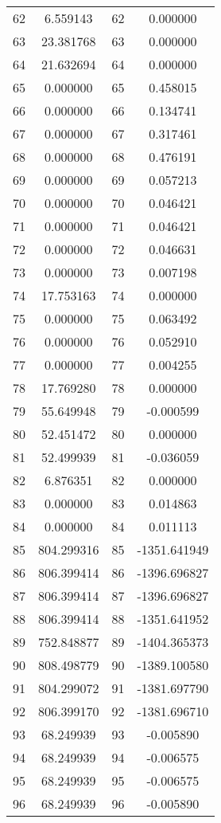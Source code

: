 \documentclass[12pt]{article}
\begin{document}
\begin{longtable}{@{}cccc@{}}
62 & 6.559143 & 62 & 0.000000 \\
63 & 23.381768 & 63 & 0.000000 \\
64 & 21.632694 & 64 & 0.000000 \\
65 & 0.000000 & 65 & 0.458015 \\
66 & 0.000000 & 66 & 0.134741 \\
67 & 0.000000 & 67 & 0.317461 \\
68 & 0.000000 & 68 & 0.476191 \\
69 & 0.000000 & 69 & 0.057213 \\
70 & 0.000000 & 70 & 0.046421 \\
71 & 0.000000 & 71 & 0.046421 \\
72 & 0.000000 & 72 & 0.046631 \\
73 & 0.000000 & 73 & 0.007198 \\
74 & 17.753163 & 74 & 0.000000 \\
75 & 0.000000 & 75 & 0.063492 \\
76 & 0.000000 & 76 & 0.052910 \\
77 & 0.000000 & 77 & 0.004255 \\
78 & 17.769280 & 78 & 0.000000 \\
79 & 55.649948 & 79 & -0.000599 \\
80 & 52.451472 & 80 & 0.000000 \\
81 & 52.499939 & 81 & -0.036059 \\
82 & 6.876351 & 82 & 0.000000 \\
83 & 0.000000 & 83 & 0.014863 \\
84 & 0.000000 & 84 & 0.011113 \\
85 & 804.299316 & 85 & -1351.641949 \\
86 & 806.399414 & 86 & -1396.696827 \\
87 & 806.399414 & 87 & -1396.696827 \\
88 & 806.399414 & 88 & -1351.641952 \\
89 & 752.848877 & 89 & -1404.365373 \\
90 & 808.498779 & 90 & -1389.100580 \\
91 & 804.299072 & 91 & -1381.697790 \\
92 & 806.399170 & 92 & -1381.696710 \\
93 & 68.249939 & 93 & -0.005890 \\
94 & 68.249939 & 94 & -0.006575 \\
95 & 68.249939 & 95 & -0.006575 \\
96 & 68.249939 & 96 & -0.005890 \\

\end{longtable}
\end{document}
